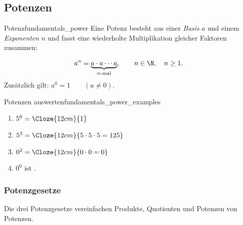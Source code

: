 \subsection{Potenzen}
\label{subsec:fundamentals_powers}

\begin{samepage}
  \begin{DefinitionBox}{Potenz}{fundamentals_power}
    Eine Potenz besteht aus einer \emph{Basis} $a$ und einem \emph{Exponenten} $n$ und
    fasst eine wiederholte Multiplikation gleicher Faktoren zusammen:\par
    \begin{minipage}[c]{0.61\linewidth}
      \[
        a^n = \underbrace{a\cdot a\cdots a}_{n\text{-mal}},
        \qquad n\in\N,\quad n\geq1.
      \]
    Zusätzlich gilt: $a^0=1 \qquad (a\neq0)$.
    \end{minipage}\hfill
    \begin{minipage}[c]{0.3\linewidth}
      \centering
    \end{minipage}\par\smallskip
  \end{DefinitionBox}

  \vspace{-0.5\baselineskip}
  \begin{ExampleBox}{Potenzen auswerten}{fundamentals_power_examples}
    \begin{enumerate}[label=\alph*),itemsep=0.55em]
      \item $5^0=\Cloze{12cm}{1}$
      \item $5^3=\Cloze{12cm}{5\cdot5\cdot5=125}$
      \item $0^2=\Cloze{12cm}{0\cdot0=0}$
      \item $0^0$ ist .
    \end{enumerate}
  \end{ExampleBox}
\end{samepage}

\subsubsection{Potenzgesetze}
\label{subsubsec:fundamentals_power_laws}

Die drei Potenzgesetze vereinfachen Produkte, Quotienten und Potenzen von
Potenzen.

